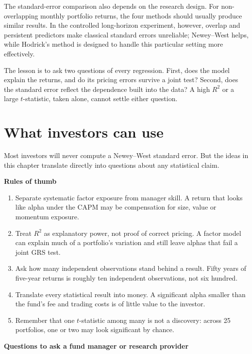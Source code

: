 The standard-error comparison also depends on the research design. For non-overlapping monthly portfolio returns, the four methods should usually produce similar results. In the controlled long-horizon experiment, however, overlap and persistent predictors make classical standard errors unreliable; Newey--West helps, while Hodrick's method is designed to handle this particular setting more effectively.

The lesson is to ask two questions of every regression. First, does the model explain the returns, and do its pricing errors survive a joint test? Second, does the standard error reflect the dependence built into the data? A high $R^2$ or a large $t$-statistic, taken alone, cannot settle either question.

\section{What investors can use}
\label{sec:03-investors}

Most investors will never compute a Newey--West standard error. But the ideas in this chapter translate directly into questions about any statistical claim.

\textbf{Rules of thumb}

\begin{enumerate}
  \item Separate systematic factor exposure from manager skill. A return that looks like alpha under the CAPM may be compensation for size, value or momentum exposure.
  \item Treat $R^2$ as explanatory power, not proof of correct pricing. A factor model can explain much of a portfolio's variation and still leave alphas that fail a joint GRS test.
  \item Ask how many independent observations stand behind a result. Fifty years of five-year returns is roughly ten independent observations, not six hundred.
  \item Translate every statistical result into money. A significant alpha smaller than the fund's fee and trading costs is of little value to the investor.
  \item Remember that one $t$-statistic among many is not a discovery: across 25 portfolios, one or two may look significant by chance.
\end{enumerate}

\textbf{Questions to ask a fund manager or research provider}

